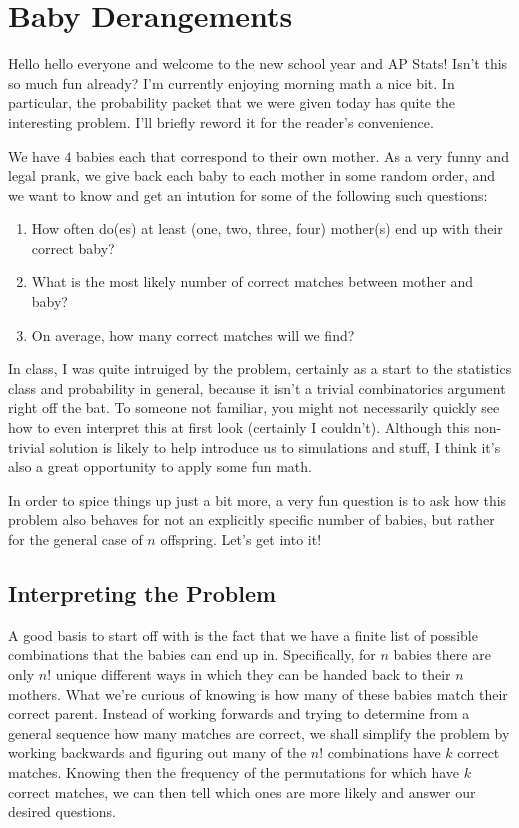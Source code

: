 \section{Baby Derangements}

Hello hello everyone and welcome to the new school year and AP Stats!
 Isn't this
so much fun already? I'm currently enjoying morning math a nice bit. In
particular, the probability packet that we were given today has quite the
interesting problem. I'll briefly reword it for the reader's convenience.

\begin{blackbox}
    We have \( 4 \) babies each that correspond to their own mother. As a very
    funny and legal prank, we give back each baby to each mother in some random
    order, and we want to know and get an intution for some of the following
    such questions:
    \begin{enumerate}
        \item How often do(es) at least (one, two, three, four) mother(s) end up with their correct baby?
        \item What is the most likely number of correct matches between mother and baby?
        \item On average, how many correct matches will we find?
    \end{enumerate}
\end{blackbox}

In class, I was quite intruiged by the problem, certainly as a start to the
statistics class and probability in general, because it isn't a trivial
combinatorics argument right off the bat. To someone not familiar, you might
not necessarily quickly see how to even interpret this at first look (certainly
I couldn't). Although this non-trivial solution is likely to help introduce us
to simulations and stuff, I think it's also a great opportunity to apply some
fun math.

In order to spice things up just a bit more, a very fun question is to ask how
this problem also behaves for not an explicitly specific number of babies, but
rather for the general case of \( n \) offspring. Let's get into it!

\subsection{Interpreting the Problem}

A good basis to start off with is the fact that we have a finite list of
possible combinations that the babies can end up in. Specifically, for \( n \)
babies there are only \( n! \) unique different ways in which they can be
handed back to their \( n \) mothers. What we're curious of knowing is how many
of these babies match their correct parent. Instead of working forwards and
trying to determine from a general sequence how many matches are correct, we
shall simplify the problem by working backwards and figuring out many of the \(
n! \) combinations have \( k \) correct matches. Knowing then the frequency of
the permutations for which have \( k \) correct matches, we can then tell which
ones are more likely and answer our desired questions.


